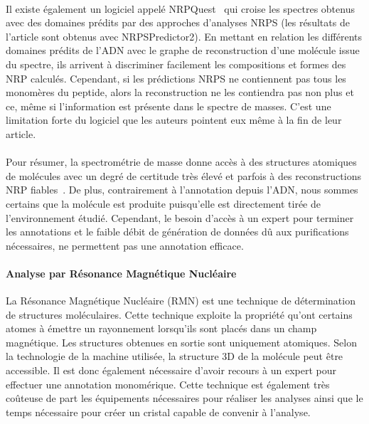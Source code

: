 \documentclass[12pt,french,twoside]{report}
\begin{document}
\paragraph{}Il existe également un logiciel appelé NRPQuest~\cite{mohimani_nrpquest:_2014} qui croise les spectres obtenus avec des domaines prédits par des approches d'analyses NRPS (les résultats de l'article sont obtenus avec NRPSPredictor2).
En mettant en relation les différents domaines prédits de l'ADN avec le graphe de reconstruction d'une molécule issue du spectre, ils arrivent à discriminer facilement les compositions et formes des NRP calculés.
Cependant, si les prédictions NRPS ne contiennent pas tous les monomères du peptide, alors la reconstruction ne les contiendra pas non plus et ce, même si l'information est présente dans le spectre de masses.
C'est une limitation forte du logiciel que les auteurs pointent eux même à la fin de leur article.

\paragraph{}Pour résumer, la spectrométrie de masse donne accès à des structures atomiques de molécules avec un degré de certitude très élevé et parfois à des reconstructions NRP fiables~\cite{mohimani_dereplication_2015}.
De plus, contrairement à l'annotation depuis l'ADN, nous sommes certains que la molécule est produite puisqu'elle est directement tirée de l'environnement étudié.
Cependant, le besoin d'accès à un expert pour terminer les annotations et le faible débit de génération de données dû aux purifications nécessaires, ne permettent pas une annotation efficace.


\paragraph{Analyse par Résonance Magnétique Nucléaire}
La Résonance Magnétique Nucléaire (RMN) est une technique de détermination de structures moléculaires.
Cette technique exploite la propriété qu'ont certains atomes à émettre un rayonnement lorsqu'ils sont placés dans un champ magnétique.
Les structures obtenues en sortie sont uniquement atomiques.
Selon la technologie de la machine utilisée, la structure 3D de la molécule peut être accessible.
Il est donc également nécessaire d'avoir recours à un expert pour effectuer une annotation monomérique.
Cette technique est également très coûteuse de part les équipements nécessaires pour réaliser les analyses ainsi que le temps nécessaire pour créer un cristal capable de convenir à l'analyse.
\end{document}
